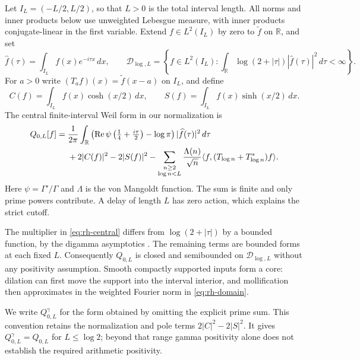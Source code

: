 Let $I_L=(-L/2,L/2)$, so that $L>0$ is the total interval length.
All norms and inner products below use unweighted Lebesgue measure, with
inner products conjugate-linear in the first variable. Extend
$f\in L^2(I_L)$ by zero to $\widetilde f$ on $\mathbb R$, and set
\begin{equation}
\widehat f(\tau)=\int_{I_L}f(x)e^{-i\tau x}\,dx,\qquad
\mathcal D_{\log,L}=
\left\{f\in L^2(I_L):
\int_{\mathbb R}\log(2+|\tau|)|\widehat f(\tau)|^2\,d\tau<\infty\right\}.
\label{eq:rh-domain}
\end{equation}
For $a>0$ write $(T_af)(x)=\widetilde f(x-a)$ on $I_L$, and define
\[
C(f)=\int_{I_L}f(x)\cosh(x/2)\,dx,\qquad
S(f)=\int_{I_L}f(x)\sinh(x/2)\,dx.
\]
The central finite-interval Weil form in our normalization is
\begin{align}
Q_{0,L}[f]={}&
\frac1{2\pi}\int_{\mathbb R}
\left(\operatorname{Re}\psi\left(\tfrac14+\tfrac{i\tau}{2}\right)
-\log\pi\right)|\widehat f(\tau)|^2\,d\tau \notag\\
&+2|C(f)|^2-2|S(f)|^2
-\sum_{\substack{n\ge2\\\log n<L}}\frac{\Lambda(n)}{\sqrt n}
\langle f,(T_{\log n}+T_{\log n}^*)f\rangle .
\label{eq:rh-central}
\end{align}
Here $\psi=\Gamma'/\Gamma$ and $\Lambda$ is the von Mangoldt function.
The sum is finite and only prime powers contribute. A delay of length
$L$ has zero action, which explains the strict cutoff.

The multiplier in \eqref{eq:rh-central} differs from
$\log(2+|\tau|)$ by a bounded function, by the digamma asymptotics
\cite[\S5.11]{DLMF}. The remaining terms are bounded forms at each
fixed $L$. Consequently $Q_{0,L}$ is closed and semibounded on
$\mathcal D_{\log,L}$ without any positivity assumption.
Smooth compactly supported inputs form a core: dilation can first move
the support into the interval interior, and mollification then approximates
in the weighted Fourier norm in \eqref{eq:rh-domain}.

We write $Q^\gamma_{0,L}$ for the form obtained by omitting the explicit
prime sum. This convention retains the normalization and pole terms
$2|C|^2-2|S|^2$. It gives $Q^\gamma_{0,L}=Q_{0,L}$ for
$L\leq\log2$; beyond that range gamma positivity alone does not establish
the required arithmetic positivity.

